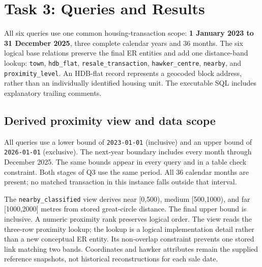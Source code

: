 \documentclass[11pt,a4paper]{article}
\begin{document}
\section{Task 3: Queries and Results}
\begin{samepage}All six queries use one common housing-transaction scope: \textbf{1 January 2023 to 31 December 2025}, three complete calendar years and 36 months. The six logical base relations preserve the final ER entities and add one distance-band lookup: \texttt{town}, \texttt{hdb\_flat}, \texttt{resale\_transaction}, \texttt{hawker\_centre}, \texttt{nearby}, and \texttt{proximity\_level}. An HDB-flat record represents a geocoded block address, rather than an individually identified housing unit. The executable SQL includes explanatory trailing comments.\par\end{samepage}

\subsection{Derived proximity view and data scope}
\begin{samepage}All queries use a lower bound of \texttt{2023-01-01} (inclusive) and an upper bound of \texttt{2026-01-01} (exclusive). The next-year boundary includes every month through December 2025. The same bounds appear in every query and in a table check constraint. Both stages of Q3 use the same period. All 36 calendar months are present; no matched transaction in this instance falls outside that interval.\par\end{samepage}

\begin{samepage}The \texttt{nearby\_classified} view derives near [0,500), medium [500,1000), and far [1000,2000] metres from stored great-circle distance. The final upper bound is inclusive. A numeric proximity rank preserves logical order. The view reads the three-row proximity lookup; the lookup is a logical implementation detail rather than a new conceptual ER entity. Its non-overlap constraint prevents one stored link matching two bands. Coordinates and hawker attributes remain the supplied reference snapshots, not historical reconstructions for each sale date.\par\end{samepage}
\end{document}
